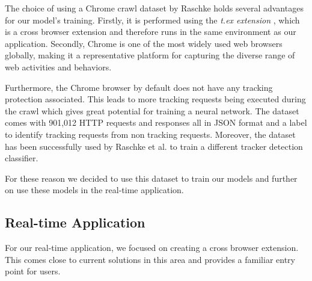 The choice of using a Chrome crawl dataset by Raschke holds several advantages for our model's training. Firstly, it is performed 
using the \emph{t.ex extension} \cite{9972261}, which is a cross browser extension and therefore runs in the same environment as our
application. Secondly, Chrome is one of the most widely used web browsers globally, making it a representative platform for
capturing the diverse range of web activities and behaviors.

Furthermore, the Chrome browser by default does not have any tracking protection associated. This leads to more tracking requests being executed
during the crawl which gives great potential for training a neural network. The dataset comes with 901,012 HTTP requests and responses all in JSON
format and a label to identify tracking requests from non tracking requests. Moreover, the dataset has been successfully used by Raschke et al. \cite{raschke2023}
to train a different tracker detection classifier.

For these reason we decided to use this dataset \cite{raschke_philip_2022_7123945} to train our models and further on use these models
in the real-time application.

\subsection{Real-time Application}

For our real-time application, we focused on creating a cross browser extension. This comes close to current solutions in this area 
and provides a familiar entry point for users. 

